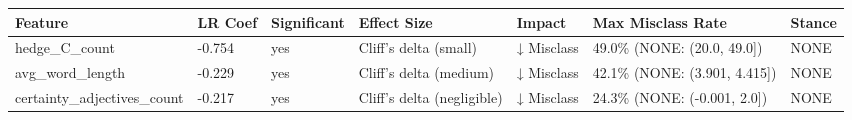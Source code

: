 \begin{tabular}{lllllll}
\toprule
Feature & LR Coef & Significant & Effect Size & Impact & Max Misclass Rate & Stance \\
\midrule
hedge\_C\_count & -0.754 & yes & Cliff's delta (small) & ↓ Misclass & 49.0\% (NONE: (20.0, 49.0]) & NONE \\
avg\_word\_length & -0.229 & yes & Cliff's delta (medium) & ↓ Misclass & 42.1\% (NONE: (3.901, 4.415]) & NONE \\
certainty\_adjectives\_count & -0.217 & yes & Cliff's delta (negligible) & ↓ Misclass & 24.3\% (NONE: (-0.001, 2.0]) & NONE \\
\bottomrule
\end{tabular}
